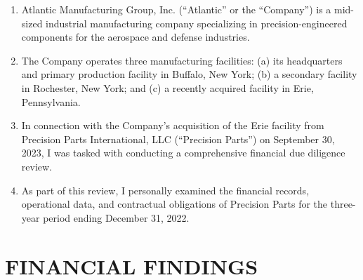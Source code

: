 \documentclass[
    language=english,
    doctype=affidavit,
    institution=none,
]{../../omnilatex}
\begin{document}
\begin{enumerate}[resume]
    \item Atlantic Manufacturing Group, Inc. (``Atlantic'' or the ``Company'') is a mid-sized industrial manufacturing company specializing in precision-engineered components for the aerospace and defense industries.
    \item The Company operates three manufacturing facilities: (a) its headquarters and primary production facility in Buffalo, New York; (b) a secondary facility in Rochester, New York; and (c) a recently acquired facility in Erie, Pennsylvania.
    \item In connection with the Company's acquisition of the Erie facility from Precision Parts International, LLC (``Precision Parts'') on September 30, 2023, I was tasked with conducting a comprehensive financial due diligence review.
    \item As part of this review, I personally examined the financial records, operational data, and contractual obligations of Precision Parts for the three-year period ending December 31, 2022.
\end{enumerate}

\section{FINANCIAL FINDINGS}
\end{document}
